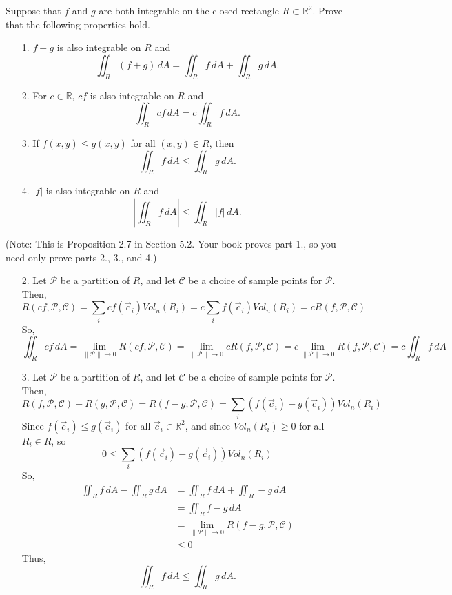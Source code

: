 \documentclass[11pt,letterpaper,cm]{nupset}
\begin{document}
\begin{problem}[Exercise 8] Suppose that $f$ and $g$ are both integrable on the closed rectangle $R\subset\mathbb{R}^2$.  Prove that the following properties hold.
	\begin{itemize}
		\item[1.] $f+g$ is also integrable on $R$ and $$\iint_R (f+g)\,dA = \iint_R f\,dA + \iint_R g\,dA.$$
		\item[2.] For $c\in \mathbb{R}$, $cf$ is also integrable on $R$ and $$\iint_R cf\, dA = c\iint_R f\,dA.$$
		\item[3.] If $f(x,y)\leq g(x,y)$ for all $(x,y)\in R$, then $$\iint_R f\,dA \leq \iint_R g\,dA.$$
		\item[4.] $|f|$ is also integrable on $R$ and $$\left| \iint_R f\,dA\right|\leq \iint_R |f|\,dA.$$
	\end{itemize}
	(Note: This is Proposition 2.7 in Section 5.2.  Your book proves part 1., so you need only prove parts 2., 3., and 4.)
\end{problem}
\begin{solution}
	\begin{itemize}
		\item [2.] Let $\mathscr{P}$ be a partition of $R$, and let $\mathscr{C}$ be a choice of sample points for $\mathscr{P}$. Then,
		$$R(cf,\mathscr{P},\mathscr{C})=\sum_{i} cf(\vec{c}_i)Vol_n(R_i)=c\sum_{i} f(\vec{c}_i)Vol_n(R_i)=cR(f,\mathscr{P},\mathscr{C})$$
		So,
		$$\iint_R cf\, dA=\lim\limits_{\|\mathscr{P}\|\to 0} R(cf,\mathscr{P},\mathscr{C})=\lim\limits_{\|\mathscr{P}\|\to 0}cR(f,\mathscr{P},\mathscr{C})=c\lim\limits_{\|\mathscr{P}\|\to 0}R(f,\mathscr{P},\mathscr{C})=c\iint_R f\,dA$$
		\item [3.] Let $\mathscr{P}$ be a partition of $R$, and let $\mathscr{C}$ be a choice of sample points for $\mathscr{P}$. Then,
		$$R(f,\mathscr{P},\mathscr{C})-R(g,\mathscr{P},\mathscr{C})=R(f-g,\mathscr{P},\mathscr{C})=\sum_{i} (f(\vec{c}_i)-g(\vec{c}_i))Vol_n(R_i)$$
		Since $f(\vec{c}_i)\leq g(\vec{c}_i)$ for all $\vec{c}_i\in\mathbb{R}^2$, and since $Vol_n(R_i)\geq 0$ for all $R_i\in R$, so
		$$0\leq \sum_{i} (f(\vec{c}_i)-g(\vec{c}_i))Vol_n(R_i)$$
		So,
		\begin{align*}
			\iint_R f\,dA - \iint_R g\,dA &= \iint_R f\,dA + \iint_R -g\,dA\\
			&= \iint_R f-g\,dA\\
			&= \lim\limits_{\|\mathscr{P}\|\to 0} R(f-g,\mathscr{P},\mathscr{C})\\
			&\leq 0
		\end{align*}
		Thus, 
		$$\iint_R f\,dA \leq \iint_R g\,dA.$$
		
	\end{itemize}
\end{solution}
\newpage
\end{document}
